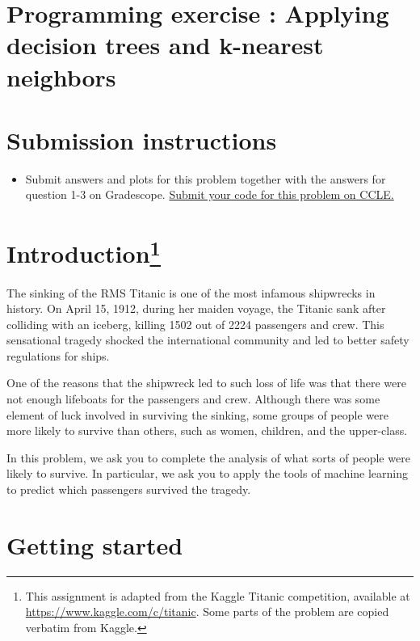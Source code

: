 
\section{Programming exercise : Applying decision trees and k-nearest neighbors }

\section*{Submission instructions}
\begin{itemize}
\item {\large Submit answers and plots for this problem together with the answers for question 1-3 on Gradescope. 
	\ul{Submit your code for this problem on CCLE.}}
\end{itemize}


\section*{Introduction\footnote{This assignment is adapted from the Kaggle Titanic competition, available at \url{https://www.kaggle.com/c/titanic}. Some parts of the problem are copied verbatim from Kaggle.}}

The sinking of the RMS Titanic is one of the most infamous shipwrecks in history.  On April 15, 1912, during her maiden voyage, the Titanic sank after colliding with an iceberg, killing 1502 out of 2224 passengers and crew. This sensational tragedy shocked the international community and led to better safety regulations for ships.

One of the reasons that the shipwreck led to such loss of life was that there were not enough lifeboats for the passengers and crew. Although there was some element of luck involved in surviving the sinking, some groups of people were more likely to survive than others, such as women, children, and the upper-class.

In this problem, we ask you to complete the analysis of what sorts of people were likely to survive. In particular, we ask you to apply the tools of machine learning to predict which passengers survived the tragedy.


\section*{Getting started}

